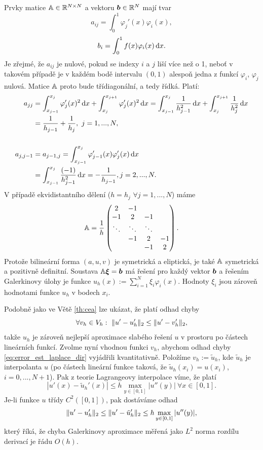 Prvky matice ${\mathbb{A}}\in\mathbb R^{N\times N}$ a vektoru $\mathbf{\boldsymbol{b}}\in\mathbb R^{N}$ mají tvar
\[ a_{ij}=\int_0^1\varphi_j'(x)\varphi_i(x), \]
\[ b_i = \int_0^1 f(x)\varphi_i(x)\,{\rm d} x. \]
Je zřejmé, že $a_{ij}$ je nulové, pokud se indexy $i$ a $j$ liší více než o 1, neboť v takovém případě je v každém bodě intervalu $(0,1)$ alespoň jedna z funkcí $\varphi_i$, $\varphi_j$ nulová. Matice ${\mathbb{A}}$ proto bude třídiagonální, a tedy řídká.
Platí:
\begin{align*}
a_{jj} &= \int_{x_{j-1}}^{x_j}\varphi_j'(x)^2\,{\rm d} x + \int_{x_j}^{x_{j+1}}\varphi_j'(x)^2\,{\rm d} x
= \int_{x_{j-1}}^{x_j}\frac1{h_{j-1}^2}\,{\rm d} x + \int_{x_j}^{x_{j+1}}\frac1{h_j^2}\,{\rm d} x\\
&= \frac1{h_{j-1}} + \frac1{h_j},~j=1,...,N,\\\\
a_{j,j-1} &= a_{j-1,j} = \int_{x_{j-1}}^{x_j}\varphi_{j-1}'(x)\varphi_j'(x)\,{\rm d} x\\
&= \int_{x_{j-1}}^{x_j}\frac{(-1)}{h_{j-1}^2} \,{\rm d} x = -\frac1{h_{j-1}}, j=2,...,N.
\end{align*}
V případě ekvidistantního dělení ($h=h_j$ $\forall j=1,...,N$) máme
\[ {\mathbb{A}} = \frac{1}{h}\begin{pmatrix}2 & -1 & \\-1 & 2 & -1\\\ddots&\ddots&\ddots\\&-1 & 2 & -1\\&& -1 & 2\end{pmatrix}. \]
Protože bilineární forma $(a,u,v)$ je symetrická a eliptická, je také ${\mathbb{A}}$ symetrická a pozitivně definitní.
Soustava ${\mathbb{A}}\mathbf{\boldsymbol{\xi}}=\mathbf{\boldsymbol{b}}$ má řešení pro každý vektor $\mathbf{\boldsymbol{b}}$ a řešením Galerkinovy úlohy je funkce $u_h(x):=\sum_{i=1}^N\xi_i\varphi_i(x)$.
Hodnoty $\xi_i$ jsou zároveň hodnotami funkce $u_h$ v bodech $x_i$.

Podobně jako ve Větě \ref{th:cea} lze ukázat, že platí odhad chyby
\begin{equation}\label{eq:error_est_laplace_dir}
\forall v_h\in V_h:~\|u'-u_h'\|_2 \le \|u'-v_h'\|_2,
\end{equation}
takže $u_h$ je zároveň nejlepší aproximace slabého řešení $u$ v prostoru po částech lineárních funkcí.
Zvolme nyní vhodnou funkci $v_h$, abychom odhad chyby \eqref{eq:error_est_laplace_dir} vyjádřili kvantitativně.
Položíme $v_h:=\tilde u_h$, kde $\tilde u_h$ je interpolanta $u$ (po částech lineární funkce taková, že $\tilde u_h(x_i)=u(x_i)$, $i=0,...,N+1$).
Pak z teorie Lagrangeovy interpolace víme, že platí
\[ |u'(x)-\tilde u_h'(x)|\le h\max_{y\in[0,1]}|u''(y)| ~\forall x\in[0,1]. \]
Je-li funkce $u$ třídy $C^2([0,1])$, pak dostáváme odhad
\[ \|u'-u_h'\|_2 \le \|u'-\tilde u_h'\|_2 \le h\max_{y\in[0,1]}|u''(y)|, \]
který říká, že chyba Galerkinovy aproximace měřená jako $L^2$ norma rozdílu derivací je řádu $O(h)$.


